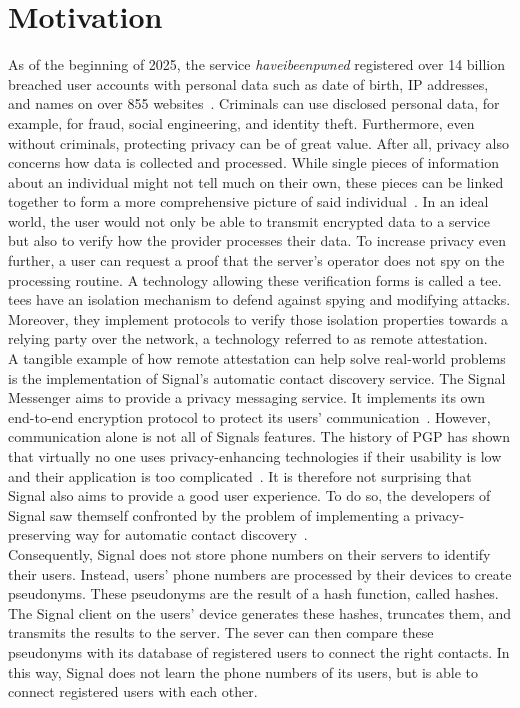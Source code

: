 \section{Motivation}
\label{sec:10:motivation}
As of the beginning of 2025, the service \textit{haveibeenpwned} registered over
14 billion breached user accounts with personal data such as date of birth, IP
addresses, and names on over 855 websites~\cite{haveibeenpawned}. Criminals can
use disclosed personal data, for example, for fraud, social engineering, and
identity theft. Furthermore, even without criminals, protecting privacy can be
of great value. After all, privacy also concerns how data is collected and
processed. While single pieces of information about an individual might not tell
much on their own, these pieces can be linked together to form a more
comprehensive picture of said individual~\cite{solove2007ve}. In an ideal world,
the user would not only be able to transmit encrypted data to a service but also
to verify how the provider processes their data. To increase privacy even
further, a user can request a proof that the server's operator does not spy on
the processing routine. A technology allowing these verification forms is called
a \gls{tee}. \glspl{tee} have an isolation mechanism to defend against spying
and modifying attacks. Moreover, they implement protocols to verify those
isolation properties towards a relying party over the network, a technology
referred to as remote attestation. \\

A tangible example of how remote attestation can help solve real-world problems
is the implementation of Signal's automatic contact discovery service. The
Signal Messenger aims to provide a privacy messaging service. It implements its
own end-to-end encryption protocol to protect its users'
communication~\cite{cohn2020formal}. However, communication alone is not all of
Signals features. The history of PGP has shown that virtually no one uses
privacy-enhancing technologies if their usability is low and their application
is too complicated~\cite{ruoti2015johnny}. It is therefore not surprising that
Signal also aims to provide a good user experience. To do so, the developers of
Signal saw themself confronted by the problem of implementing a
privacy-preserving way for automatic contact discovery~\cite{SignalCd}.\\

Consequently, Signal does not store phone numbers on their servers to identify
their users. Instead, users' phone numbers are processed by their devices to
create pseudonyms. These pseudonyms are the result of a hash function, called
hashes. The Signal client on the users' device generates these hashes, truncates
them, and transmits the results to the server. The sever can then compare these
pseudonyms with its database of registered users to connect the right contacts.
In this way, Signal does not learn the phone numbers of its users, but is able
to connect registered users with each other.\\


